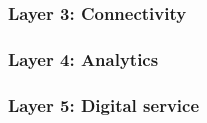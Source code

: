 \subsubsection{Layer 3: Connectivity}


\subsubsection{Layer 4: Analytics}


\subsubsection{Layer 5: Digital service}
